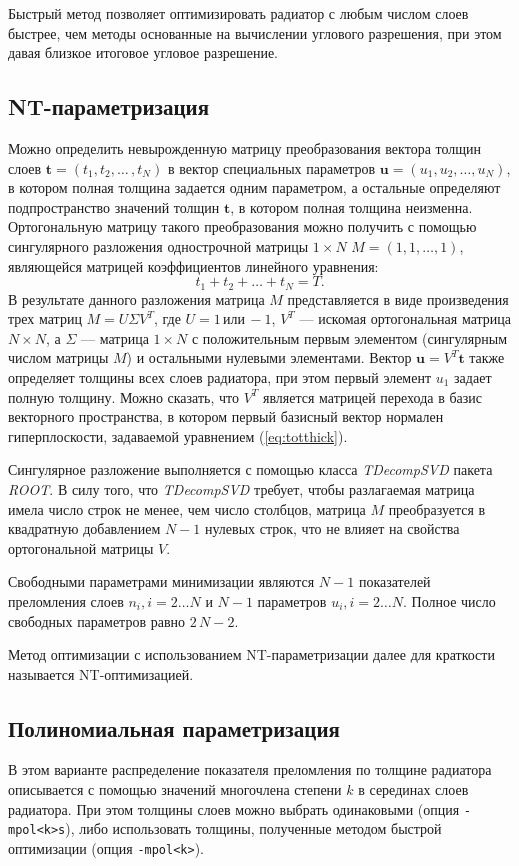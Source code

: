 \documentclass[12pt]{article}
\begin{document}
Быстрый метод позволяет оптимизировать радиатор с любым числом слоев быстрее, чем методы основанные на вычислении углового разрешения, при этом давая близкое 
итоговое угловое разрешение.

\subsection{NT-параметризация}
\label{ss:ntpar}
Можно определить невырожденную матрицу преобразования вектора толщин слоев $\boldsymbol{t}=(t_1,t_2,\ldots\,,t_{N})$ в вектор 
специальных параметров $\boldsymbol{u}=(u_1,u_2,\ldots,u_{N})$, в котором полная толщина задается одним параметром, 
а остальные определяют подпространство значений толщин $\boldsymbol{t}$, в котором полная толщина неизменна. 
Ортогональную матрицу такого преобразования можно получить с помощью сингулярного 
разложения однострочной матрицы $1\times N$ $M=(1,1,\ldots,1)$, являющейся матрицей коэффициентов линейного уравнения:
\begin{equation}
t_1+t_2+\ldots+t_{N} = T.
\label{eq:totthick}
\end{equation}
В результате данного разложения матрица $M$ представляется в виде произведения трех матриц $M=U\Sigma V^T$, где $U=1\, \mathrm{или}\, -1$,
$V^T$ --- искомая ортогональная матрица $N\times N$, а $\Sigma$ --- матрица $1\times N$ с положительным первым элементом (сингулярным числом матрицы $M$) и остальными 
нулевыми элементами. Вектор $\boldsymbol{u} = V^T \boldsymbol{t}$ также определяет толщины всех слоев радиатора, при этом первый элемент $u_1$ задает полную толщину. 
Можно сказать, что $V^T$ является матрицей перехода в  базис векторного пространства, в котором первый базисный вектор нормален гиперплоскости, задаваемой уравнением (\ref{eq:totthick}).

Сингулярное разложение выполняется с помощью класса {\em TDecompSVD} пакета {\em ROOT}. В силу того, что {\em TDecompSVD} требует, чтобы разлагаемая матрица 
имела число строк не менее, чем число столбцов, матрица $M$ преобразуется в квадратную добавлением $N-1$ нулевых строк, что не влияет на свойства ортогональной матрицы $V$.

Свободными параметрами минимизации являются $N-1$ показателей преломления слоев $n_i, i=2\ldots N$ и $N-1$ параметров $u_i, i=2\ldots N$. 
Полное число свободных параметров равно $2\,N - 2$.

Метод оптимизации с использованием NT-параметризации далее для краткости называется NT-оптимизацией.

\subsection{Полиномиальная параметризация}
\label{ss:polpar}
В этом варианте распределение показателя преломления по толщине радиатора описывается с помощью значений многочлена степени $k$ в серединах 
слоев радиатора. При этом толщины слоев можно выбрать одинаковыми (опция {\tt -mpol<k>s}), либо использовать толщины, полученные методом быстрой 
оптимизации (опция {\tt -mpol<k>}).
\end{document}

